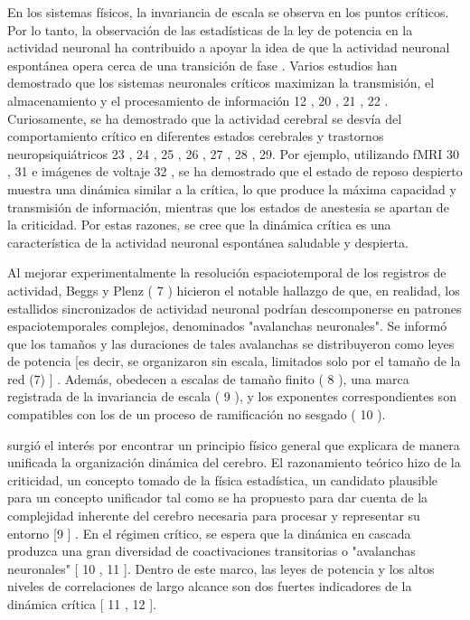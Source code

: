 En los sistemas físicos, la invariancia de escala se observa en los puntos críticos. Por lo tanto, la observación de las estadísticas de la ley de potencia en la actividad neuronal ha contribuido a apoyar la idea de que la actividad neuronal espontánea opera cerca de una transición de fase . Varios estudios han demostrado que los sistemas neuronales críticos maximizan la transmisión, el almacenamiento y el procesamiento de información 12 , 20 , 21 , 22 . Curiosamente, se ha demostrado que la actividad cerebral se desvía del comportamiento crítico en diferentes estados cerebrales y trastornos neuropsiquiátricos 23 , 24 , 25 , 26 , 27 , 28 , 29. Por ejemplo, utilizando fMRI 30 , 31 e imágenes de voltaje 32 , se ha demostrado que el estado de reposo despierto muestra una dinámica similar a la crítica, lo que produce la máxima capacidad y transmisión de información, mientras que los estados de anestesia se apartan de la criticidad. Por estas razones, se cree que la dinámica crítica es una característica de la actividad neuronal espontánea saludable y despierta.


Al mejorar experimentalmente la resolución espaciotemporal de los registros de actividad, Beggs y Plenz ( 7 ) hicieron el notable hallazgo de que, en realidad, los estallidos sincronizados de actividad neuronal podrían descomponerse en patrones espaciotemporales complejos, denominados "avalanchas neuronales". Se informó que los tamaños y las duraciones de tales avalanchas se distribuyeron como leyes de potencia [es decir, se organizaron sin escala, limitados solo por el tamaño de la red (7) ] . Además, obedecen a escalas de tamaño finito ( 8 ), una marca registrada de la invariancia de escala ( 9 ), y los exponentes correspondientes son compatibles con los de un proceso de ramificación no sesgado ( 10 ).




surgió el interés por encontrar un principio físico general que explicara de manera unificada la organización dinámica del cerebro. El razonamiento teórico hizo de la criticidad, un concepto tomado de la física estadística, un candidato plausible para un concepto unificador tal como se ha propuesto para dar cuenta de la complejidad inherente del cerebro necesaria para procesar y representar su entorno [9 ] . En el régimen crítico, se espera que la dinámica en cascada produzca una gran diversidad de coactivaciones transitorias o "avalanchas neuronales" [ 10 , 11 ]. Dentro de este marco, las leyes de potencia y los altos niveles de correlaciones de largo alcance son dos fuertes indicadores de la dinámica crítica [ 11 , 12 ].\\


